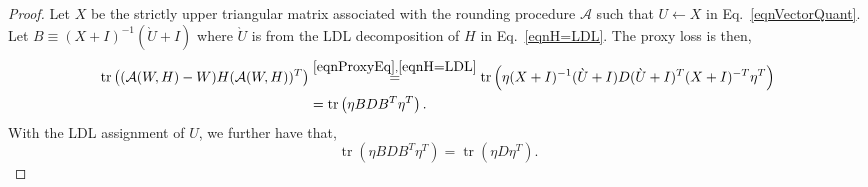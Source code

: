 \begin{proof}
Let $X$ be the strictly upper triangular matrix associated with the rounding procedure $\mathcal{A}$ such that $U \gets X$ in Eq.~\eqref{eqnVectorQuant}.
Let $B \equiv (X + I)^{-1} (\grave U + I)$ where $\grave U$ is from the LDL decomposition of $H$ in Eq.~\eqref{eqnH=LDL}.
The proxy loss is then, 
\begin{align}
    \operatorname{tr}\left( (\mathcal{A}(W, H) - W) H (\mathcal{A}(W, H))^T \right)
    &\stackrel{\eqref{eqnProxyEq},\eqref{eqnH=LDL}}{=}
    \operatorname{tr}\left( \eta (X + I)^{-1} (\grave U + I) D (\grave U + I)^T (X + I)^{-T} \eta^T \right)\nonumber\\
    &= 
    \operatorname{tr}\left( \eta B D B^T \eta^T \right).
    \label{eqnThm1proofa} 
\end{align}
With the LDL assignment of $U$, we further have that,
\begin{equation}
    \label{eqnThm1proofb} 
    \operatorname{tr}\left( \eta B D B^T \eta^T \right)
    =
    \operatorname{tr}\left( \eta D \eta^T \right).
\end{equation}


\end{proof}

